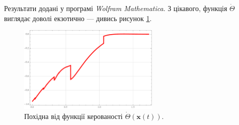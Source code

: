 \documentclass{hw_template}
\begin{document}
Результати додані у програмі \textit{Wolfram Mathematica}. З цікавого, функція 
$\dot{\Theta}$ виглядає доволі екзотично --- дивись рисунок \ref{fig:theta_dot}.

\begin{figure}[H]
    \centering
    \includegraphics[width=0.6\textwidth]{figures/theta_dot.pdf}
    \caption{Похідна від функції керованості $\dot{\Theta}(\mathbf{x}(t))$.}
    \label{fig:theta_dot}
\end{figure}
\end{document}

